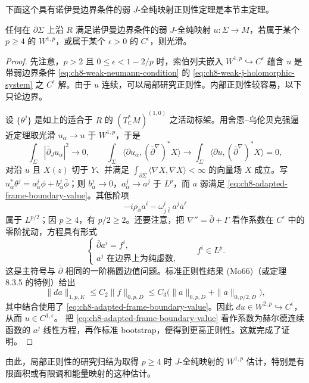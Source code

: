 下面这个具有诺伊曼边界条件的弱 $J$-全纯映射正则性定理是本节主定理。
\begin{theorem}\label{thm:ch8-weak-boundary-regularity}
任何在 $\partial\Sigma$ 上沿 $R$ 满足诺伊曼边界条件的弱 $J$-全纯映射
$u:\Sigma\to M$，若属于某个 $p\geq4$ 的 $W^{1,p}$，或属于某个
$\epsilon>0$ 的 $C^\epsilon$，则光滑。
\end{theorem}
\begin{proof}
先注意，$p>2$ 且 $0\leq\epsilon<1-2/p$ 时，索伯列夫嵌入
$W^{1,p}\hookrightarrow C^\epsilon$ 蕴含 $u$ 是带弱边界条件
\eqref{eq:ch8-weak-neumann-condition} 的 \eqref{eq:ch8-weak-j-holomorphic-system}
之 $C^\epsilon$ 解。由于 $u$ 连续，可以局部研究正则性。内部正则性较容易，以下只论边界。

设 $\{\theta^j\}$ 是如上的适合于 $R$ 的 $(T_\mathbb C^*M)^{(1,0)}$
之活动标架。用舍恩--乌伦贝克强逼近定理取光滑
$u_\alpha\to u$ 于 $W^{1,p}$，于是
\[
 \int_\Sigma|\bar\partial_Ju_\alpha|^2\to0,
\qquad
 \int_\Sigma\langle\partial u_\alpha,(\bar\partial^\nabla)^*X\rangle
 \to\int_\Sigma\langle\partial u,(\bar\partial^\nabla)^*X\rangle=0,
\]
对沿 $u$ 且 $X(z)$ 切于 $Y$、并满足
$\int_{\partial\Sigma}\langle\nabla X,\nabla X\rangle<\infty$ 的向量场 $X$ 成立。写
$u_\alpha^*\theta^j=a_\alpha^j\phi+b_\alpha^j\bar\phi$；则
$b_\alpha^j\to0$，$a_\alpha^j\to a^j$ 于 $L^p$，而 $a$ 弱满足
\eqref{eq:ch8-adapted-frame-boundary-value}。其低阶项
\begin{equation}
 -i\rho_{\bar\phi}a^i-\omega^i_{j\bar\ell}a^j\bar a^\ell
 \label{eq:ch8-moving-frame-lower-order}
\end{equation}
属于 $L^{p/2}$；因 $p\geq4$，有 $p/2\geq2$。还要注意，把
$\nabla''=\bar\partial+\Gamma$ 看作系数在 $C^\epsilon$ 中的零阶扰动，方程具有形式
\[
 \begin{cases}
 \bar\partial a^i=f^i,\\
 a^j\text{ 在边界上为纯虚数},
 \end{cases}
 \qquad f^i\in L^p.
\]
这是主符号与 $\bar\partial$ 相同的一阶椭圆边值问题。标准正则性结果
(Mo66)（或定理 8.3.5 的特例）给出
\[
 \|da\|_{1,p,K}\leq C_2\|f\|_{0,p,D}
 \leq C_3\bigl(\|a\|_{0,p,D}+\|a\|_{0,p/2,D}\bigr),
\]
其中结合使用了 \eqref{eq:ch8-adapted-frame-boundary-value}。因此
$du\in W^{2,p}\hookrightarrow C^\epsilon$，从而 $u\in C^{1,\epsilon}$。
把 \eqref{eq:ch8-adapted-frame-boundary-value} 看作系数为赫尔德连续函数的
$a^j$ 线性方程，再作标准 bootstrap，便得到更高正则性。这就完成了证明。
\end{proof}

由此，局部正则性的研究归结为取得 $p\geq4$ 时 $J$-全纯映射的
$W^{1,p}$ 估计，特别是有限面积或有限调和能量映射的这种估计。

